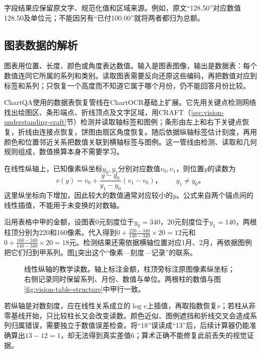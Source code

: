 字段结果应保留原文字、规范化值和区域来源。例如，原文“128.50”对应数值128.50及单位元；不能因另有“已付100.00”就将两者都归为总额。

\subsection{图表数据的解析}
\label{sec:vision-understanding-charts}
\label{sec:vision-understanding-chart-reading}

图表用位置、长度、颜色或角度表达数值。输入是图表图像，输出是数据表：每个数值连同它所属的系列和类别。读取图表需要反向还原这些编码，再把数值对应到标签和系列；只恢复一个高度而不知道它属于哪个月份，仍不能回答月份比较。

ChartQA使用的数据表恢复管线在ChartOCR基础上扩展。它先用关键点检测网络找出绘图区、条形端点、折线顶点及文字区域，用CRAFT（\ref{sec:vision-understanding-craft}节）检测并读取轴标签和图例；条形由左上和右下关键点恢复，折线由连接点恢复，饼图由扇区角度恢复。随后依据纵轴标签估计刻度，再用颜色和位置邻近关系把数值关联到横轴标签与图例。这一管线由检测、读取和几何规则组成，数值换算本身不需要学习。

在线性纵轴上，已知像素纵坐标$y_0,y_1$分别对应数值$v_0,v_1$，则位置$y$的读数为
\begin{equation}
  v(y)=v_0+\frac{y-y_0}{y_1-y_0}(v_1-v_0)\text{，}
  \qquad y_1\neq y_0\text{。}
  \label{eq:vision-chart-calibration}
\end{equation}
这里纵坐标向下增加，因此较大的数值通常对应较小的$y$。公式来自两个锚点间的线性插值，不能用于未变换的对数轴。

沿用表格中甲的金额，设图表0元刻度位于$y_0=340$，20元刻度位于$y_1=140$，两根柱顶分别为220和160像素。代入得到$0+\frac{220-340}{140-340}\times20=12$元和$0+\frac{160-340}{140-340}\times20=18$元。检测结果还需依据横轴位置对应1月、2月，再依据图例把它们归到甲系列。图\ref{fig:vision-chart-reading}突出这个“像素—刻度—记录”的联系。

\begin{figure}[htbp]
  \centering
  
  \caption{线性纵轴的教学读数。轴上标注金额，柱顶旁标注原图像素纵坐标；右侧记录同时保留系列、月份、数值与单位。两根柱的数值与图\ref{fig:vision-table-structure}中甲行一致。}
  \label{fig:vision-chart-reading}
\end{figure}
\FloatBarrier

若纵轴是对数刻度，应在线性关系成立的$\log v$上插值，再取指数恢复$v$；若柱从非零基线开始，只比较柱长又会改变读数。颜色近似、图例遮挡和折线交叉会造成系列归属错误，需要独立于数值误差检查。将“18”误读成“13”后，后续计算器仍能准确算出$13-12=1$，却无法得到真实差值6；算术正确不能修复此前丢失的视觉证据。

